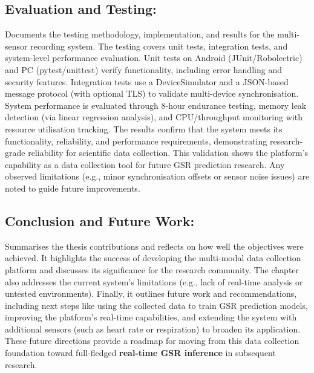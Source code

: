 \subsection{Evaluation and Testing:} Documents the testing methodology, implementation, and results for the multi-sensor recording system. The testing covers unit tests, integration tests, and system-level performance evaluation. Unit tests on Android (JUnit/Robolectric) and PC (pytest/unittest) verify functionality, including error handling and security features. Integration tests use a DeviceSimulator and a JSON-based message protocol (with optional TLS) to validate multi-device synchronisation. System performance is evaluated through 8-hour endurance testing, memory leak detection (via linear regression analysis), and CPU/throughput monitoring with resource utilisation tracking. The results confirm that the system meets its functionality, reliability, and performance requirements, demonstrating research-grade reliability for scientific data collection. This validation shows the platform's capability as a data collection tool for future GSR prediction research. Any observed limitations (e.g., minor synchronisation offsets or sensor noise issues) are noted to guide future improvements.

\subsection{Conclusion and Future Work:} Summarises the thesis contributions and reflects on how well the objectives were achieved. It highlights the success of developing the multi-modal data collection platform and discusses its significance for the research community. The chapter also addresses the current system's limitations (e.g., lack of real-time analysis or untested environments). Finally, it outlines future work and recommendations, including next steps like using the collected data to train GSR prediction models, improving the platform's real-time capabilities, and extending the system with additional sensors (such as heart rate or respiration) to broaden its application. These future directions provide a roadmap for moving from this data collection foundation toward full-fledged \textbf{real-time GSR inference} in subsequent research.
